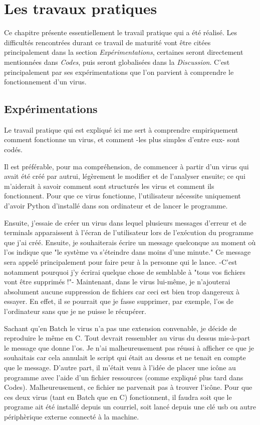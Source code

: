 \chapter{Les travaux pratiques} \label{chapter:configuration}

Ce chapitre présente essentiellement le travail pratique qui a été réalisé. Les difficultés rencontrées durant ce travail de maturité vont être citées principalement dans la section \textit{Expérimentations}, certaines seront directement mentionnées dans \textit{Codes}, puis seront globalisées dans la \textit{Discussion}. C'est principalement par ses expérimentations que l'on parvient à comprendre le fonctionnement d'un virus.   

\section{Expérimentations}

Le travail pratique qui est expliqué ici me sert à comprendre empiriquement comment fonctionne un virus, et comment -les plus simples d'entre eux- sont codés.

Il est préférable, pour ma compréhension, de commencer à partir d'un virus qui avait été créé par autrui, légèrement le modifier et de l'analyser ensuite; ce qui m'aiderait à savoir comment sont structurés les virus et comment ils fonctionnent. Pour que ce virus fonctionne, l'utilisateur nécessite uniquement d'avoir Python d'installé dans son ordinateur et de lancer le programme.    

Ensuite, j'essaie de créer un virus dans lequel plusieurs messages d'erreur et de terminals apparaissent à l'écran de l'utilisateur lors de l'exécution du programme que j'ai créé. Ensuite, je souhaiterais écrire un message quelconque au moment où l'os indique que "le système va s'éteindre dans moins d'une minute." Ce message sera appelé principalement pour faire peur à la personne qui le lance. -C'est notamment pourquoi j'y écrirai quelque chose de semblable à "tous vos fichiers vont être supprimés !"- Maintenant, dans le virus lui-même, je n'ajouterai absolument aucune suppression de fichiers car ceci est bien trop dangereux à essayer. En effet, il se pourrait que je fasse supprimer, par exemple, l'os de l'ordinateur sans que je ne puisse le récupérer.

Sachant qu'en Batch le virus n'a pas une extension convenable, je décide de reproduire le même en C. Tout devrait ressembler au virus du dessus mis-à-part le message que donne l'os. Je n'ai malheureusement pas réussi à afficher ce que je souhaitais car cela annulait le script qui était au dessus et ne tenait en compte que le message. D'autre part, il m'était venu à l'idée de placer une icône au programme avec l'aide d'un fichier ressources (comme expliqué plus tard dans Codes). Malheureusement, ce fichier ne parvenait pas à trouver l'icône.
Pour que ces deux virus (tant en Batch que en C) fonctionnent, il faudra soit que le programe ait été installé depuis un courriel, soit lancé depuis une clé usb ou autre périphèrique externe connecté à la machine.     

